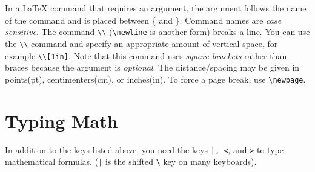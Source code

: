 \documentclass[12pt]{article}
\begin{document}
In a \LaTeX \; command that requires an argument, the argument follows the name of the command and is placed between \{ and \}. Command names are \emph{case sensitive}. The command \verb+\\+ (\verb+\newline+ is another form) breaks a line. You can use the \verb+\\+ command and specify an appropriate amount of vertical space, for example \verb+\\[1in]+. Note that this command uses \emph{square brackets} rather than braces because the argument  is \emph{optional}. The distance/spacing may be given in points(pt), centimenters(cm), or inches(in).  To force a page break, use \verb+\newpage+. 

\section{Typing Math}
In addition to the keys listed above, you need the keys \verb+|, <+, and \verb+>+ to type mathematical formulas. (\verb+|+ is the shifted \verb+\+ key on many keyboards). \\
\end{document}
